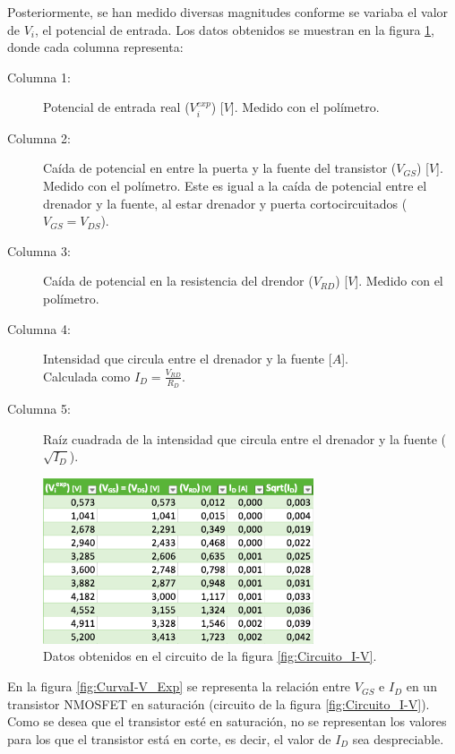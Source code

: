 Posteriormente, se han medido diversas magnitudes conforme se variaba el valor de $V_i$, el potencial de entrada. Los datos obtenidos se muestran en la figura \ref{fig:Datos_I-V}, donde cada columna representa:
\begin{description}
    \item [Columna 1:] Potencial de entrada real ($V_i^{exp}$) [$V$]. Medido con el polímetro.
    \item [Columna 2:] Caída de potencial en entre la puerta y la fuente del transistor ($V_{GS}$) [$V$]. Medido con el polímetro. Este es igual a la caída de potencial entre el drenador y la fuente, al estar drenador y puerta cortocircuitados ($V_{GS}=V_{DS}$).
    \item [Columna 3:] Caída de potencial en la resistencia del drendor ($V_{RD}$) [$V$]. Medido con el polímetro.
    \item [Columna 4:] Intensidad que circula entre el drenador y la fuente [$A$].\\ Calculada como $I_D = \frac{V_{RD}}{R_D}$.
    \item [Columna 5:] Raíz cuadrada de la intensidad que circula entre el drenador y la fuente ($\sqrt{I_D}$).
\end{description}

\begin{figure}
    \centering
    \includegraphics[width=8cm]{Imágenes 05/Tabla_Datos_CurvaI-V.png}
    \caption{Datos obtenidos en el circuito de la figura \ref{fig:Circuito_I-V}.}
    \label{fig:Datos_I-V}
\end{figure}

En la figura \ref{fig:CurvaI-V_Exp} se representa la relación entre $V_{GS}$ e $I_D$ en un transistor NMOSFET en saturación (circuito de la figura \ref{fig:Circuito_I-V}). Como se desea que el transistor esté en saturación, no se representan los valores para los que el transistor está en corte, es decir, el valor de $I_D$ sea despreciable.

